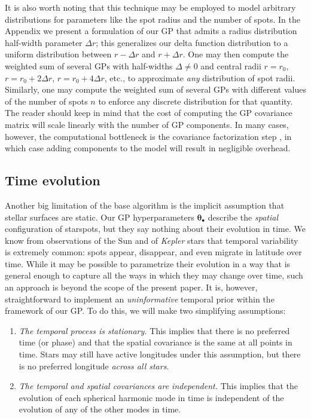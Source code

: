 \documentclass[modern,linenumbers]{aastex62}
\begin{document}
It is also worth noting that this technique may be employed to model arbitrary
distributions for parameters like the spot radius and the number of spots. In
the Appendix we present a formulation of our GP that admits a radius distribution
half-width parameter $\Delta r$; this generalizes our delta function distribution to
a uniform distribution between $r - \Delta r$ and $r + \Delta r$. One may then
compute the weighted sum of several GPs
with half-widths $\Delta \ne 0$ and central radii
$r = r_0$,
$r = r_0 + 2\Delta r$,
$r = r_0 + 4\Delta r$,
etc., to approximate \emph{any} distribution of spot radii. Similarly, one
may compute the weighted sum of several GPs with different values of the
number of spots $n$ to enforce any discrete distribution for that quantity.
The reader should keep in mind that the cost of computing the GP
covariance matrix will scale linearly with the number of GP components.
In many cases, however, the computational bottleneck is the covariance factorization
step \citep{JOSSPaper}, in which case adding components to the
model will result in negligible overhead.

\subsection{Time evolution}
\label{sec:temporal}

Another big limitation of the base algorithm is the implicit assumption that
stellar surfaces are static. Our GP hyperparameters $\pmb{\theta}_\bullet$
describe the \emph{spatial} configuration of starspots, but they say nothing
about their evolution in time. We know from observations of the Sun and of
\emph{Kepler} stars that temporal variability is extremely common: spots appear,
disappear, and even migrate in latitude over time. While it may be possible to
parametrize their evolution in a way that is general enough to capture all the
ways in which they may change over time, such an approach is beyond the scope
of the present paper. It is, however, straightforward to implement an
\emph{uninformative} temporal prior within the framework of our GP. To do this,
we will make two simplifying assumptions:

\begin{enumerate}
    \item \emph{The temporal process is stationary.} This implies that there is no
          preferred time (or phase) and that the spatial covariance is the
          same at all points in time. Stars may still have active longitudes
          under this assumption, but there is no preferred longitude
          \emph{across all stars}.
    \item \emph{The temporal and spatial covariances are independent.} This implies
          that the evolution of each spherical harmonic mode in time is independent of the
          evolution of any of the other modes in time.
\end{enumerate}
\end{document}

